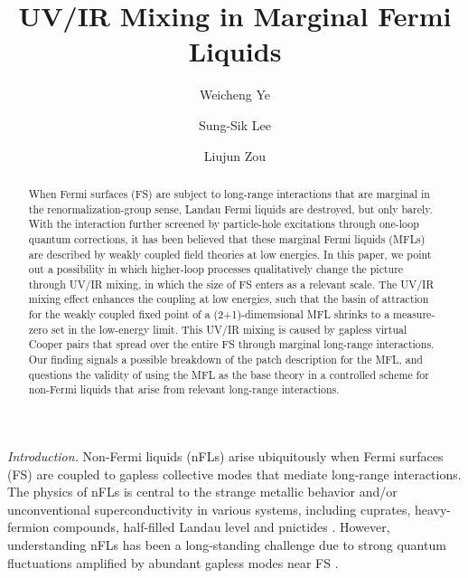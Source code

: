 \documentclass[prl,amsmath,amssymb, notitlepage, twocolumn,
nofootinbib,
superscriptaddress,
longbibliography
]{revtex4-1}
\begin{document}
\title{
UV/IR Mixing in Marginal Fermi Liquids  
}
	
\author{Weicheng Ye}

\author{Sung-Sik Lee}
	
\author{Liujun Zou}

\begin{abstract}

When Fermi surfaces (FS) are subject to long-range interactions that are marginal in the renormalization-group sense, 
Landau Fermi liquids  are destroyed,  but only barely.
With the interaction further screened by 
particle-hole excitations through one-loop  quantum corrections,
it has been believed that
these marginal Fermi liquids (MFLs) are described by weakly coupled field theories at low energies.
In this paper, we point out a possibility in which higher-loop processes qualitatively change the picture through UV/IR mixing, in which the size of FS enters as a relevant scale.
The UV/IR mixing effect enhances the coupling at low energies, such that the basin of attraction for the weakly coupled fixed point of a (2+1)-dimemsional MFL shrinks to a measure-zero set in the low-energy limit.
This UV/IR mixing is caused by gapless
virtual Cooper pairs 
that spread over the
entire FS
through marginal long-range interactions.
Our finding signals a possible breakdown of the patch description for the MFL, and questions the validity of using the MFL as the base theory  in a controlled scheme for non-Fermi liquids that arise from relevant long-range interactions.

\end{abstract}

\maketitle



{\it Introduction.} 
Non-Fermi liquids (nFLs) arise ubiquitously when Fermi surfaces (FS) are coupled to gapless collective modes that mediate long-range interactions.
The physics of nFLs is central to  the strange metallic behavior and/or unconventional superconductivity in various systems, including cuprates, heavy-fermion compounds, half-filled Landau level
and pnictides \cite{Senthil2006, Lee2017, Berg2018}. However, understanding nFLs 
has been a long-standing challenge due to
strong quantum fluctuations 
amplified by abundant gapless modes near FS \cite{
Polchinski1992,
ALTSHULER,
Kim1995,
ABANOV2,
Lee2009,
Metlitski2010}. 
\end{document}

